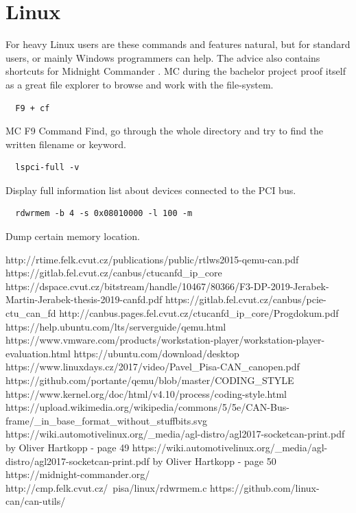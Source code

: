 \documentclass{ctuthesis}
\begin{document}
 \section{Linux}
  For heavy Linux users are these commands and features natural, but for standard users, or mainly Windows programmers can help. The advice also contains shortcuts for Midnight Commander \cite{mc}. MC during the bachelor project proof itself as a great file explorer to browse and work with the file-system.
  \begin{verbatim}  F9 + cf\end{verbatim}
  MC F9 Command Find, go through the whole directory and try to find the written filename or keyword.
  \begin{verbatim}  lspci-full -v\end{verbatim}
  Display full information list about devices connected to the PCI bus.
  \begin{verbatim}  rdwrmem -b 4 -s 0x08010000 -l 100 -m\end{verbatim}
  Dump certain memory location. \cite{rdwrmem}
 
 
\renewcommand\bibname{References}
\begin{thebibliography}{1}
 http://rtime.felk.cvut.cz/publications/public/rtlws2015-qemu-can.pdf
 https://gitlab.fel.cvut.cz/canbus/ctucanfd\_ip\_core
 https://dspace.cvut.cz/bitstream/handle/10467/80366/F3-DP-2019-Jerabek-Martin-Jerabek-thesis-2019-canfd.pdf
 https://gitlab.fel.cvut.cz/canbus/pcie-ctu\_can\_fd
 http://canbus.pages.fel.cvut.cz/ctucanfd\_ip\_core/Progdokum.pdf
 https://help.ubuntu.com/lts/serverguide/qemu.html
 https://www.vmware.com/products/workstation-player/workstation-player-evaluation.html
 https://ubuntu.com/download/desktop
 https://www.linuxdays.cz/2017/video/Pavel\_Pisa-CAN\_canopen.pdf
 https://github.com/portante/qemu/blob/master/CODING\_STYLE
 https://www.kernel.org/doc/html/v4.10/process/coding-style.html
 https://upload.wikimedia.org/wikipedia/commons/5/5e/CAN-Bus-frame/\_in\_base\_format\_without\_stuffbits.svg
 https://wiki.automotivelinux.org/\_media/agl-distro/agl2017-socketcan-print.pdf by Oliver Hartkopp - page 49
 https://wiki.automotivelinux.org/\_media/agl-distro/agl2017-socketcan-print.pdf by Oliver Hartkopp - page 50
 https://midnight-commander.org/
 http://cmp.felk.cvut.cz/~pisa/linux/rdwrmem.c
 https://github.com/linux-can/can-utils/
\end{thebibliography}
\end{document}
